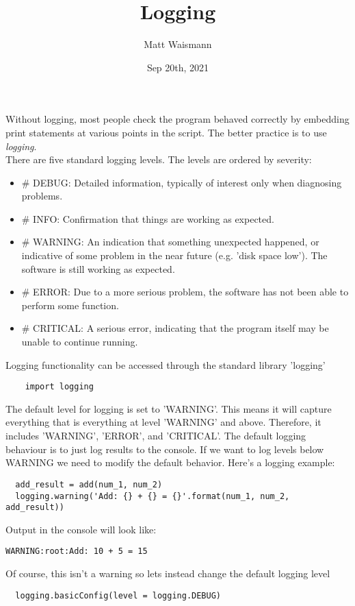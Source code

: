 \documentclass{article}%
\title{Logging}
\date{Sep 20th, 2021}
\author{Matt Waismann}
\begin{document}
\maketitle
Without logging, most people check the program behaved correctly by embedding print statements at various points in the script. The better practice is to use \textit{logging}. \\

There are five standard logging levels. The levels are ordered by severity:
\begin{itemize}
  \item \# DEBUG: Detailed information, typically of interest only when diagnosing problems.
  \item \# INFO: Confirmation that things are working as expected.
  \item \# WARNING: An indication that something unexpected happened, or indicative of some problem in the near future (e.g. 'disk space low'). The software is still working as expected.
  \item \# ERROR: Due to a more serious problem, the software has not been able to perform some function.
  \item \# CRITICAL: A serious error, indicating that the program itself may be unable to continue running.
\end{itemize}
Logging functionality can be accessed through the standard library 'logging'
\begin{lstlisting}
    import logging
\end{lstlisting}
The default level for logging is set to 'WARNING'. This means it will capture everything that is everything at level 'WARNING' and above. Therefore, it includes 'WARNING', 'ERROR', and 'CRITICAL'. The default logging behaviour is to just log results to the console. If we want to log levels below WARNING we need to modify the default behavior.
Here's a logging example:
\begin{lstlisting}
  add_result = add(num_1, num_2)
  logging.warning('Add: {} + {} = {}'.format(num_1, num_2, add_result))
\end{lstlisting}
Output in the console will look like:
\begin{lstlisting}
WARNING:root:Add: 10 + 5 = 15
\end{lstlisting}
Of course, this isn't a warning so lets instead change the default logging level
\begin{lstlisting}
  logging.basicConfig(level = logging.DEBUG)
\end{lstlisting}
\end{document}
